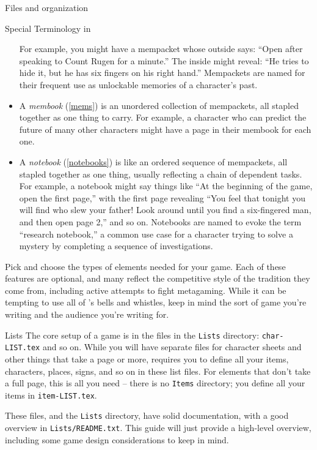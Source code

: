 \documentclass[sheet]{GameTexBase}
\begin{document}
\begin{section}{Files and organization}
\begin{subsection}{Special Terminology in \gametex{}}
\begin{itemize}
For example, you might have a mempacket whose outside says: ``Open after speaking to Count Rugen for a minute.'' The inside might reveal: ``He tries to hide it, but he has six fingers on his right hand.''  Mempackets are named for their frequent use as unlockable memories of a character's past.
    \item A \textit{membook} (\ref{mems}) is an unordered collection of mempackets, all stapled together as one thing to carry.  For example, a character who can predict the future of many other characters might have a page in their membook for each one.
    \item A \textit{notebook} (\ref{notebooks}) is like an ordered sequence of mempackets, all stapled together as one thing, usually reflecting a chain of dependent tasks.  For example, a notebook might say things like ``At the beginning of the game, open the first page,'' with the first page revealing ``You feel that tonight you will find who slew your father!  Look around until you find a six-fingered man, and then open page 2,'' and so on.  Notebooks are named to evoke the term ``research notebook,'' a common use case for a character trying to solve a mystery by completing a sequence of investigations.
\end{itemize}

Pick and choose the types of elements needed for your game.  Each of these features are optional, and many reflect the competitive style of the tradition they come from, including active attempts to fight metagaming.  While it can be tempting to use all of \gametex{}'s bells and whistles, keep in mind the sort of game you're writing and the audience you're writing for.
\end{subsection}
\begin{subsection}{Lists}
\label{lists}
The core setup of a game is in the files in the \lstinline{Lists} directory: \lstinline{char-LIST.tex} and so on.
While you will have separate files for character sheets and other things that take a page or more, \gametex{} requires you to define all your items, characters, places, signs, and so on in these list files.
For elements that don't take a full page, this is all you need -- there is no \texttt{Items} directory; you define all your items in \lstinline{item-LIST.tex}.

These files, and the \lstinline{Lists} directory, have solid documentation, with a good overview in \texttt{Lists/README.txt}.  This guide will just provide a high-level overview, including some game design considerations to keep in mind.


\end{subsection}
\end{section}
\end{document}
